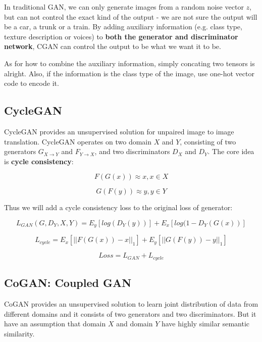 \documentclass{article} %
\begin{document}
In traditional GAN, we can only generate images from a random noise vector $z$, but can not control the exact kind of the output - we are not sure the output will be a car, a trunk or a train. By adding auxiliary information (e.g. class type, texture description or voices) to \textbf{both the generator and discriminator network}, CGAN can control the output to be what we want it to be.

As for how to combine the auxiliary information, simply concating two tensors is alright. Also, if the information is the class type of the image, use one-hot vector code to encode it.

\subsection{CycleGAN}

CycleGAN provides an unsupervised solution for unpaired image to image translation. CycleGAN operates on two domain $X$ and $Y$, consisting of two generators $G_{X \rightarrow Y}$ and $F_{Y \rightarrow X}$, and two discriminators $D_X$ and $D_Y$. The core idea is \textbf{cycle consistency}:

\begin{equation}
    F(G(x)) \approx x, x \in X
\end{equation}

\begin{equation}
    G(F(y)) \approx y, y \in Y
\end{equation}

Thus we will add a cycle consistency loss to the original loss of generator:

\begin{equation}
    L_{GAN}(G, D_Y, X, Y)=E_y[log(D_Y(y))]+E_x[log(1-D_Y(G(x))]
\end{equation}

\begin{equation}
    L_{cycle}=E_x[||F(G(x))-x||_1]+E_y[||G(F(y))-y||_1]
\end{equation}

\begin{equation}
    Loss = L_{GAN}+L_{cycle}
\end{equation}

\subsection{CoGAN: Coupled GAN}

CoGAN provides an unsupervised solution to learn joint distribution of data from different domains and it consists of two generators and two discriminators. But it have an assumption that domain $X$ and domain $Y$ have highly similar semantic similarity.
\end{document}
